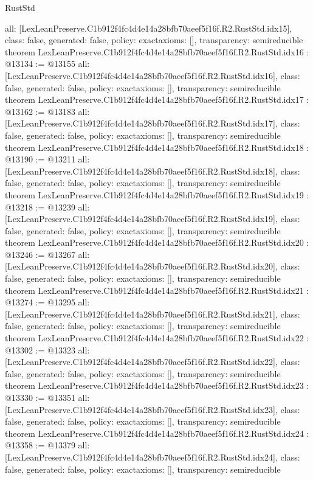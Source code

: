\begin{lexlean}{RustStd}
\begin{coremodule}
{  all: [LexLeanPreserve.C1b912f4fc4d4e14a28bfb70aeef5f16f.R2.RustStd.idx15],
  class: false,
  generated: false,
  policy: exact{axioms: []},
  transparency: semireducible
}
theorem LexLeanPreserve.C1b912f4fc4d4e14a28bfb70aeef5f16f.R2.RustStd.idx16 : @13134 := @13155 {
  all: [LexLeanPreserve.C1b912f4fc4d4e14a28bfb70aeef5f16f.R2.RustStd.idx16],
  class: false,
  generated: false,
  policy: exact{axioms: []},
  transparency: semireducible
}
theorem LexLeanPreserve.C1b912f4fc4d4e14a28bfb70aeef5f16f.R2.RustStd.idx17 : @13162 := @13183 {
  all: [LexLeanPreserve.C1b912f4fc4d4e14a28bfb70aeef5f16f.R2.RustStd.idx17],
  class: false,
  generated: false,
  policy: exact{axioms: []},
  transparency: semireducible
}
theorem LexLeanPreserve.C1b912f4fc4d4e14a28bfb70aeef5f16f.R2.RustStd.idx18 : @13190 := @13211 {
  all: [LexLeanPreserve.C1b912f4fc4d4e14a28bfb70aeef5f16f.R2.RustStd.idx18],
  class: false,
  generated: false,
  policy: exact{axioms: []},
  transparency: semireducible
}
theorem LexLeanPreserve.C1b912f4fc4d4e14a28bfb70aeef5f16f.R2.RustStd.idx19 : @13218 := @13239 {
  all: [LexLeanPreserve.C1b912f4fc4d4e14a28bfb70aeef5f16f.R2.RustStd.idx19],
  class: false,
  generated: false,
  policy: exact{axioms: []},
  transparency: semireducible
}
theorem LexLeanPreserve.C1b912f4fc4d4e14a28bfb70aeef5f16f.R2.RustStd.idx20 : @13246 := @13267 {
  all: [LexLeanPreserve.C1b912f4fc4d4e14a28bfb70aeef5f16f.R2.RustStd.idx20],
  class: false,
  generated: false,
  policy: exact{axioms: []},
  transparency: semireducible
}
theorem LexLeanPreserve.C1b912f4fc4d4e14a28bfb70aeef5f16f.R2.RustStd.idx21 : @13274 := @13295 {
  all: [LexLeanPreserve.C1b912f4fc4d4e14a28bfb70aeef5f16f.R2.RustStd.idx21],
  class: false,
  generated: false,
  policy: exact{axioms: []},
  transparency: semireducible
}
theorem LexLeanPreserve.C1b912f4fc4d4e14a28bfb70aeef5f16f.R2.RustStd.idx22 : @13302 := @13323 {
  all: [LexLeanPreserve.C1b912f4fc4d4e14a28bfb70aeef5f16f.R2.RustStd.idx22],
  class: false,
  generated: false,
  policy: exact{axioms: []},
  transparency: semireducible
}
theorem LexLeanPreserve.C1b912f4fc4d4e14a28bfb70aeef5f16f.R2.RustStd.idx23 : @13330 := @13351 {
  all: [LexLeanPreserve.C1b912f4fc4d4e14a28bfb70aeef5f16f.R2.RustStd.idx23],
  class: false,
  generated: false,
  policy: exact{axioms: []},
  transparency: semireducible
}
theorem LexLeanPreserve.C1b912f4fc4d4e14a28bfb70aeef5f16f.R2.RustStd.idx24 : @13358 := @13379 {
  all: [LexLeanPreserve.C1b912f4fc4d4e14a28bfb70aeef5f16f.R2.RustStd.idx24],
  class: false,
  generated: false,
  policy: exact{axioms: []},
  transparency: semireducible
}
\end{coremodule}
\end{lexlean}
